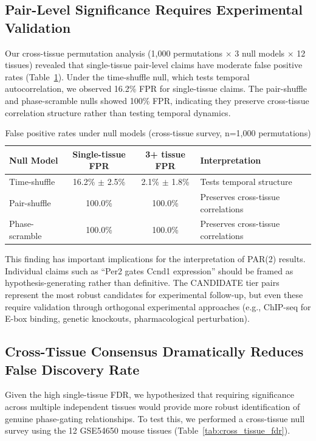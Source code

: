 \documentclass[11pt,a4paper]{article}
\begin{document}
\subsection{Pair-Level Significance Requires Experimental Validation}

Our cross-tissue permutation analysis (1,000 permutations $\times$ 3 null models $\times$ 12 tissues) revealed that single-tissue pair-level claims have moderate false positive rates (Table~\ref{tab:fpr}). Under the time-shuffle null, which tests temporal autocorrelation, we observed 16.2\% FPR for single-tissue claims. The pair-shuffle and phase-scramble nulls showed 100\% FPR, indicating they preserve cross-tissue correlation structure rather than testing temporal dynamics.

\begin{table}[H]
\centering
\caption{False positive rates under null models (cross-tissue survey, n=1,000 permutations)}
\label{tab:fpr}
\begin{tabular}{lccl}
\toprule
Null Model & Single-tissue FPR & 3+ tissue FPR & Interpretation \\
\midrule
Time-shuffle & 16.2\% $\pm$ 2.5\% & 2.1\% $\pm$ 1.8\% & Tests temporal structure \\
Pair-shuffle & 100.0\% & 100.0\% & Preserves cross-tissue correlations \\
Phase-scramble & 100.0\% & 100.0\% & Preserves cross-tissue correlations \\
\bottomrule
\end{tabular}
\end{table}

This finding has important implications for the interpretation of PAR(2) results. Individual claims such as ``Per2 gates Ccnd1 expression'' should be framed as hypothesis-generating rather than definitive. The CANDIDATE tier pairs represent the most robust candidates for experimental follow-up, but even these require validation through orthogonal experimental approaches (e.g., ChIP-seq for E-box binding, genetic knockouts, pharmacological perturbation).

\subsection{Cross-Tissue Consensus Dramatically Reduces False Discovery Rate}

Given the high single-tissue FDR, we hypothesized that requiring significance across multiple independent tissues would provide more robust identification of genuine phase-gating relationships. To test this, we performed a cross-tissue null survey using the 12 GSE54650 mouse tissues (Table~\ref{tab:cross_tissue_fdr}).
\end{document}
